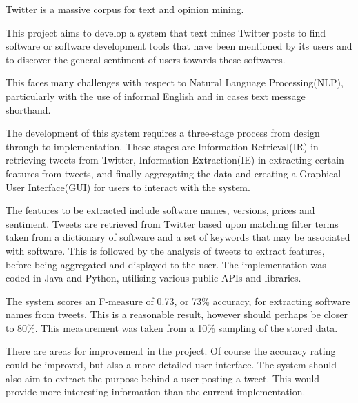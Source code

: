 Twitter is a massive corpus for text and opinion mining.

This project aims to develop a system that text mines Twitter posts to find software or software development tools that have been mentioned by its users and to discover the general sentiment of users towards these softwares.

This faces many challenges with respect to Natural Language Processing(NLP), particularly with the use of informal English and in cases text message shorthand.

The development of this system requires a three-stage process from design through to implementation. These stages are Information Retrieval(IR) in retrieving tweets from Twitter, Information Extraction(IE) in extracting certain features from tweets, and finally aggregating the data and creating a Graphical User Interface(GUI) for users to interact with the system.

The features to be extracted include software names, versions, prices and sentiment. Tweets are retrieved from Twitter based upon matching filter terms taken from a dictionary of software and a set of keywords that may be associated with software. This is followed by the analysis of tweets to extract features, before being aggregated and displayed to the user. The implementation was coded in Java and Python, utilising various public APIs and libraries.

The system scores an F-measure of 0.73, or 73\% accuracy, for extracting software names from tweets. This is a reasonable result, however should perhaps be closer to 80\%. This measurement was taken from a 10\% sampling of the stored data. 

There are areas for improvement in the project. Of course the accuracy rating could be improved, but also a more detailed user interface. The system should also aim to extract the purpose behind a user posting a tweet. This would provide more interesting information than the current implementation.

